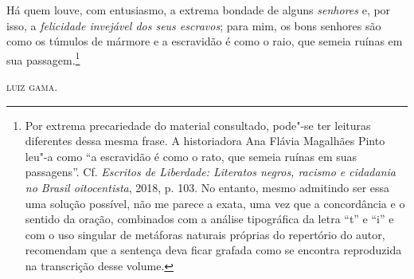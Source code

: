 Há quem louve, com entusiasmo, a extrema bondade de alguns
\emph{senhores} e, por isso, a \emph{felicidade invejável dos seus
escravos}; para mim, os bons senhores são como os túmulos de mármore e a
escravidão é como o raio, que semeia ruínas em sua passagem.\footnote{
  Por extrema precariedade do material consultado, pode"-se ter leituras
  diferentes dessa mesma frase. A historiadora Ana Flávia Magalhães
  Pinto leu"-a como ``a escravidão é como o rato, que semeia ruínas em
  suas passagens''. Cf. \emph{Escritos de Liberdade: Literatos negros,
  racismo e cidadania no Brasil oitocentista}, 2018, p. 103. No entanto,
mesmo admitindo ser essa uma solução possível, não me parece a exata,
uma vez que a concordância e o sentido da oração, combinados com a análise tipográfica da letra ``t'' e
  ``i'' e com o uso singular de metáforas naturais
  próprias do repertório do autor, recomendam que a sentença deva ficar
  grafada como se encontra reproduzida na transcrição desse volume.}

\bigskip

\hfill\textsc{luiz gama.}

\paginabranca
\mbox{}\vfill
\thispagestyle{empty}

